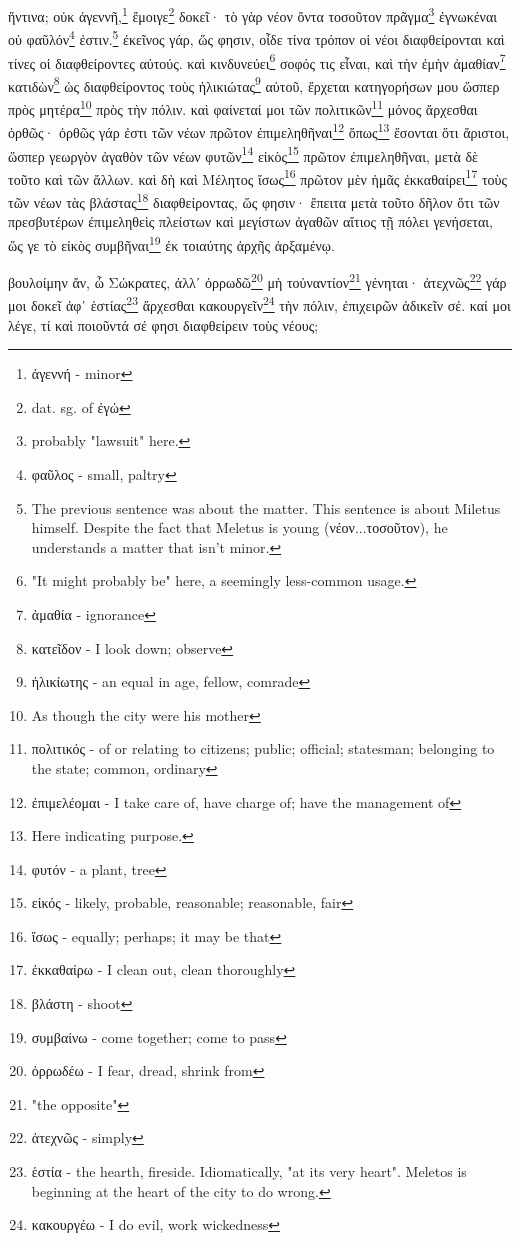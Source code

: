 ἥντινα;
οὐκ
ἀγεννῆ,\footnote{ἀγεννή - minor}
ἔμοιγε\footnote{dat. sg. of ἐγώ}
δοκεῖ·
τὸ
γὰρ
νέον
ὄντα
τοσοῦτον
πρᾶγμα\footnote{probably "lawsuit" here.}
ἐγνωκέναι
οὐ
φαῦλόν\footnote{φαῦλος - small, paltry}
ἐστιν.\footnote{The previous sentence was about the matter. This sentence is about Miletus himself. Despite the fact that Meletus is young (νέον...τοσοῦτον), he understands a matter that isn't minor.}
ἐκεῖνος
γάρ,
ὥς
φησιν,
οἶδε
τίνα
τρόπον
οἱ
νέοι
διαφθείρονται
καὶ
τίνες
οἱ
διαφθείροντες
αὐτούς.
καὶ
κινδυνεύει\footnote{"It might probably be" here, a seemingly less-common usage.}
σοφός
τις
εἶναι,
καὶ
τὴν
ἐμὴν
ἀμαθίαν\footnote{ἀμαθία - ignorance}
κατιδὼν\footnote{κατεῖδον - I look down; observe}
ὡς
διαφθείροντος
τοὺς
ἡλικιώτας\footnote{ἡλικίωτης - an equal in age, fellow, comrade}
αὐτοῦ,
ἔρχεται
κατηγορήσων
μου
ὥσπερ
πρὸς
μητέρα\footnote{As though the city were his mother}
πρὸς
τὴν
πόλιν.
καὶ
φαίνεταί
μοι
τῶν
πολιτικῶν\footnote{πολιτικός - of or relating to citizens; public; official; statesman; belonging to the state; common, ordinary}
\versification{[2d]}
μόνος
ἄρχεσθαι
ὀρθῶς·
ὀρθῶς
γάρ
ἐστι
τῶν
νέων
πρῶτον
ἐπιμεληθῆναι\footnote{ἐπιμελέομαι - I take care of, have charge of; have the management of}
ὅπως\footnote{Here indicating purpose.}
ἔσονται
ὅτι
ἄριστοι,
ὥσπερ
γεωργὸν
ἀγαθὸν
τῶν
νέων
φυτῶν\footnote{φυτόν - a plant, tree}
εἰκὸς\footnote{εἰκός - likely, probable, reasonable; reasonable, fair}
πρῶτον
ἐπιμεληθῆναι,
μετὰ
δὲ
τοῦτο
καὶ
τῶν
ἄλλων.
καὶ
δὴ
καὶ
Μέλητος
ἴσως\footnote{ἴσως - equally; perhaps; it may be that}
πρῶτον
\versification{[3a]}
μὲν
ἡμᾶς
ἐκκαθαίρει\footnote{ἐκκαθαίρω - I clean out, clean thoroughly}
τοὺς
τῶν
νέων
τὰς
βλάστας\footnote{βλάστη - shoot}
διαφθείροντας,
ὥς
φησιν·
ἔπειτα
μετὰ
τοῦτο
δῆλον
ὅτι
τῶν
πρεσβυτέρων
ἐπιμεληθεὶς
πλείστων
καὶ
μεγίστων
ἀγαθῶν
αἴτιος
τῇ
πόλει
γενήσεται,
ὥς
γε
τὸ
εἰκὸς
συμβῆναι\footnote{συμβαίνω - come together; come to pass}
ἐκ
τοιαύτης
ἀρχῆς
ἀρξαμένῳ.







βουλοίμην
ἄν,
ὦ
Σώκρατες,
ἀλλ᾽
ὀρρωδῶ\footnote{ὀρρωδέω - I fear, dread, shrink from}
μὴ
τοὐναντίον\footnote{"the opposite"}
γένηται·
ἀτεχνῶς\footnote{ἀτεχνῶς - simply}
γάρ
μοι
δοκεῖ
ἀφ᾽
ἑστίας\footnote{ἑστία - the hearth, fireside. Idiomatically, "at its very heart". Meletos is beginning at the heart of the city to do wrong.}
ἄρχεσθαι
κακουργεῖν\footnote{κακουργέω - I do evil, work wickedness}
τὴν
πόλιν,
ἐπιχειρῶν
ἀδικεῖν
σέ.
καί
μοι
λέγε,
τί
καὶ
ποιοῦντά
σέ
φησι
διαφθείρειν
τοὺς
νέους;


